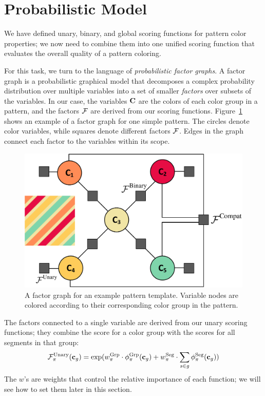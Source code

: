 \section{Probabilistic Model}
\label{sec:model}

We have defined unary, binary, and global scoring functions for pattern color properties; we now need to combine them into one unified scoring function that evaluates the overall quality of a pattern coloring.

For this task, we turn to the language of \emph{probabilistic factor graphs}. A factor graph is a probabilistic graphical model that decomposes a complex probability distribution over multiple variables into a set of smaller \emph{factors} over subsets of the variables. In our case, the variables $\mathbf{C}$ are the colors of each color group in a pattern, and the factors $\mathcal{F}$ are derived from our scoring functions. Figure~\ref{fig:FactorGraph} shows an example of a factor graph for one simple pattern. The circles denote color variables, while squares denote different factors $\mathcal{F}$. Edges in the graph connect each factor to the variables within its scope.

\begin{figure}[ht]
\centering
\includegraphics[width=0.85\columnwidth]{figs/factorGraphNew}
\caption{A factor graph for an example pattern template. Variable nodes are colored according to their corresponding color group in the pattern.}
\label{fig:FactorGraph}
\end{figure}

The factors connected to a single variable are derived from our unary scoring functions; they combine the score for a color group with the scores for all segments in that group:
\begin{equation*}
 \mathcal{F}^{\textrm{Unary}}_\pi(\mathbf{c}_g) =
 		\exp( w^{\textrm{Grp}}_\pi \cdot \phi^{\textrm{Grp}}_\pi(\mathbf{c}_g)  \\
 		     + w^{\textrm{Seg}}_\pi \cdot \sum_{s \in g} \phi^{\textrm{Seg}}_\pi(\mathbf{c}_g)) 
\end{equation*}
The $w$'s are weights that control the relative importance of each function; we will see how to set them later in this section.

